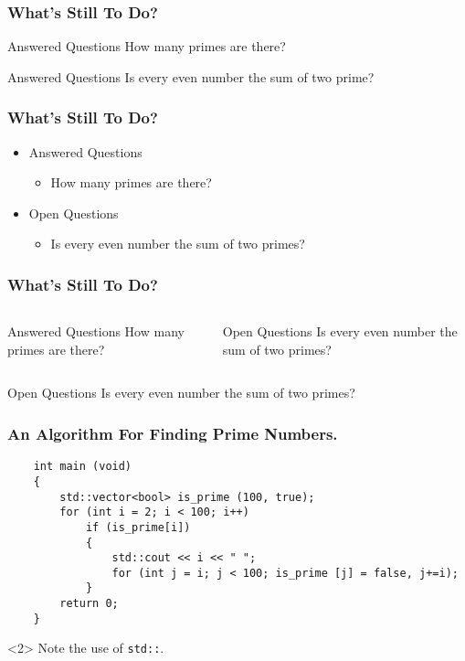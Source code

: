 \documentclass[handout]{beamer}
\begin{document}
\begin{frame}
	\frametitle{What's Still To Do?}
	
	\begin{block}{Answered Questions}
		How many primes are there?
	\end{block}
	
	\begin{block}{Answered Questions}
		Is every even number the sum of two prime?
	\end{block}
\end{frame}

\begin{frame}
	\frametitle{What’s Still To Do?}
	\begin{itemize}
		\item Answered Questions
		\begin{itemize}
			\item How many primes are there?
		\end{itemize}
		
		\item Open Questions
		\begin{itemize}
			\item Is every even number the sum of two primes?
		\end{itemize}
	\end{itemize}
\end{frame}

\begin{frame}
	\frametitle{What’s Still To Do?}
	\begin{columns}[t]
		\begin{block}{Answered Questions}
			How many primes are there?
		\end{block}
		
		\begin{block}{Open Questions}
			Is every even number the sum of two primes?
		\end{block}
	\end{columns}
\end{frame}

\begin{frame}
	\begin{block}{Open Questions}
		Is every even number the sum of two primes?\cite{Goldbach1742}
	\end{block}
\end{frame}

\begin{frame}[fragile]
	\frametitle{An Algorithm For Finding Prime Numbers.}
	\begin{verbatim}
	int main (void)
	{
		std::vector<bool> is_prime (100, true);
		for (int i = 2; i < 100; i++)
			if (is_prime[i])
			{
				std::cout << i << " ";
				for (int j = i; j < 100; is_prime [j] = false, j+=i);
			}
		return 0;
	}
	\end{verbatim}
	\begin{uncoverenv}
		Note the use of \verb|std::|.
	\end{uncoverenv}
\end{frame}
\end{document}
